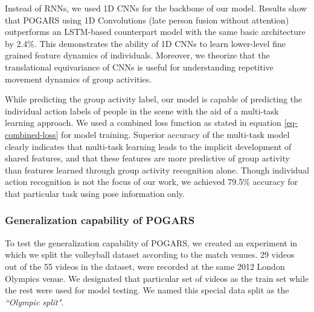 \documentclass[a4paper,fleqn]{cas-dc}
\begin{document}
Instead of RNNs, we used 1D CNNs for the backbone of our model. 
Results show that POGARS using 1D Convolutions (late person fusion without attention) outperforms an LSTM-based counterpart model with the same basic architecture by 2.4\%. 
This demonstrates the ability of 1D CNNs to learn lower-level fine grained feature dynamics of individuals. 
Moreover, we theorize that the translational equivariance of CNNs is useful for understanding repetitive movement dynamics of group activities.

While predicting the group activity label, our model is capable of predicting the individual action labels of people in the scene with the aid of a multi-task learning approach. 
We used a combined loss function as stated in equation \ref{eq-combined-loss} for model training. 
Superior accuracy of the multi-task model clearly indicates that multi-task learning leads to the implicit development of shared features, and that these features are more predictive of group activity than features learned through group activity recognition alone. 
Though individual action recognition is not the focus of our work, we achieved 79.5\% accuracy for that particular task using pose information only.

\subsubsection{Generalization capability of POGARS}
\label{ssec:generalization-capability}

\begin{table}[pos=t]
  \caption{Test accuracies for volleyball dataset with different train/test splits.}
  \label{tab:generalization-results}
\end{table}

To test the generalization capability of POGARS, we created an experiment in which we split the volleyball dataset according to the match venues. 
29 videos out of the 55 videos in the dataset, were recorded at the  same 2012 London Olympics venue. 
We designated that particular set of videos as the train set while the rest were used for model testing. 
We named this special data split as the \textit{``Olympic split"}. 
\end{document}
